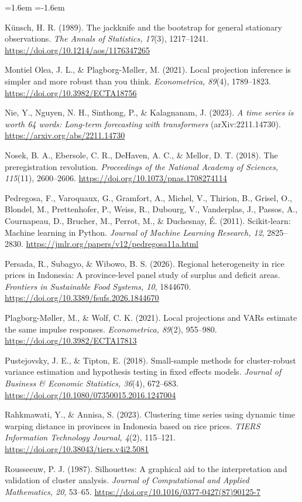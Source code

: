 \documentclass[11pt,a4paper]{article}
\newcommand{\refitem}[1]{\item\label{ref:#1}}
\begin{document}
\begin{list}{}{\leftmargin=1.6em \itemindent=-1.6em \itemsep=1.5pt \parsep=0pt \topsep=2pt}
\refitem{kunsch1989} Künsch, H. R. (1989). The jackknife and the bootstrap for general stationary observations. \textit{The Annals of
Statistics, 17}(3), 1217–1241. \url{https://doi.org/10.1214/aos/1176347265}
\refitem{montiel2021} Montiel Olea, J. L., \& Plagborg-Møller, M. (2021). Local projection inference is simpler and more robust than
you think. \textit{Econometrica, 89}(4), 1789–1823. \url{https://doi.org/10.3982/ECTA18756}
\refitem{nie2023} Nie, Y., Nguyen, N. H., Sinthong, P., \& Kalagnanam, J. (2023). \textit{A time series is worth 64 words: Long-term
forecasting with transformers} (arXiv:2211.14730). \url{https://arxiv.org/abs/2211.14730}
\refitem{nosek2018} Nosek, B. A., Ebersole, C. R., DeHaven, A. C., \& Mellor, D. T. (2018). The preregistration revolution.
\textit{Proceedings of the National Academy of Sciences, 115}(11), 2600–2606. \url{https://doi.org/10.1073/pnas.1708274114}
\refitem{pedregosa2011} Pedregosa, F., Varoquaux, G., Gramfort, A., Michel, V., Thirion, B., Grisel, O., Blondel, M., Prettenhofer,
P., Weiss, R., Dubourg, V., Vanderplas, J., Passos, A., Cournapeau, D., Brucher, M., Perrot, M., \& Duchesnay, É. (2011).
Scikit-learn: Machine learning in Python. \textit{Journal of Machine Learning Research, 12}, 2825–2830.
\url{https://jmlr.org/papers/v12/pedregosa11a.html}
\refitem{persada2026} Persada, R., Subagyo, \& Wibowo, B. S. (2026). Regional heterogeneity in rice prices in Indonesia: A
province-level panel study of surplus and deficit areas. \textit{Frontiers in Sustainable Food Systems, 10}, 1844670.
\url{https://doi.org/10.3389/fsufs.2026.1844670}
\refitem{plagborg2021} Plagborg-Møller, M., \& Wolf, C. K. (2021). Local projections and VARs estimate the same impulse responses.
\textit{Econometrica, 89}(2), 955–980. \url{https://doi.org/10.3982/ECTA17813}
\refitem{pustejovsky2018} Pustejovsky, J. E., \& Tipton, E. (2018). Small-sample methods for cluster-robust variance estimation and
hypothesis testing in fixed effects models. \textit{Journal of Business \& Economic Statistics, 36}(4), 672–683.
\url{https://doi.org/10.1080/07350015.2016.1247004}
\refitem{rahkmawati2023} Rahkmawati, Y., \& Annisa, S. (2023). Clustering time series using dynamic time warping distance in
provinces in Indonesia based on rice prices. \textit{TIERS Information Technology Journal, 4}(2), 115–121.
\url{https://doi.org/10.38043/tiers.v4i2.5081}
\refitem{rousseeuw1987} Rousseeuw, P. J. (1987). Silhouettes: A graphical aid to the interpretation and validation of cluster
analysis. \textit{Journal of Computational and Applied Mathematics, 20}, 53–65. \url{https://doi.org/10.1016/0377-0427(87)90125-7}

\end{list}
\end{document}
